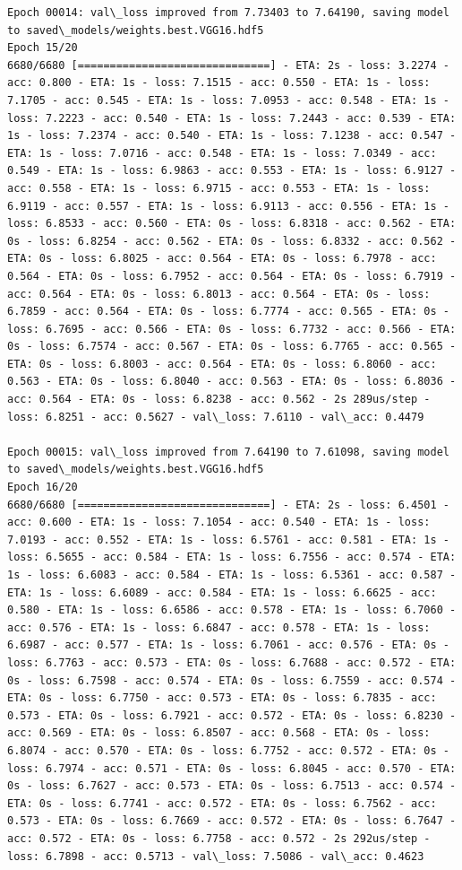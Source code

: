 \documentclass[11pt]{article}
\begin{document}
\begin{Verbatim}[commandchars=\\\{\}]
Epoch 00014: val\_loss improved from 7.73403 to 7.64190, saving model to saved\_models/weights.best.VGG16.hdf5
Epoch 15/20
6680/6680 [==============================] - ETA: 2s - loss: 3.2274 - acc: 0.800 - ETA: 1s - loss: 7.1515 - acc: 0.550 - ETA: 1s - loss: 7.1705 - acc: 0.545 - ETA: 1s - loss: 7.0953 - acc: 0.548 - ETA: 1s - loss: 7.2223 - acc: 0.540 - ETA: 1s - loss: 7.2443 - acc: 0.539 - ETA: 1s - loss: 7.2374 - acc: 0.540 - ETA: 1s - loss: 7.1238 - acc: 0.547 - ETA: 1s - loss: 7.0716 - acc: 0.548 - ETA: 1s - loss: 7.0349 - acc: 0.549 - ETA: 1s - loss: 6.9863 - acc: 0.553 - ETA: 1s - loss: 6.9127 - acc: 0.558 - ETA: 1s - loss: 6.9715 - acc: 0.553 - ETA: 1s - loss: 6.9119 - acc: 0.557 - ETA: 1s - loss: 6.9113 - acc: 0.556 - ETA: 1s - loss: 6.8533 - acc: 0.560 - ETA: 0s - loss: 6.8318 - acc: 0.562 - ETA: 0s - loss: 6.8254 - acc: 0.562 - ETA: 0s - loss: 6.8332 - acc: 0.562 - ETA: 0s - loss: 6.8025 - acc: 0.564 - ETA: 0s - loss: 6.7978 - acc: 0.564 - ETA: 0s - loss: 6.7952 - acc: 0.564 - ETA: 0s - loss: 6.7919 - acc: 0.564 - ETA: 0s - loss: 6.8013 - acc: 0.564 - ETA: 0s - loss: 6.7859 - acc: 0.564 - ETA: 0s - loss: 6.7774 - acc: 0.565 - ETA: 0s - loss: 6.7695 - acc: 0.566 - ETA: 0s - loss: 6.7732 - acc: 0.566 - ETA: 0s - loss: 6.7574 - acc: 0.567 - ETA: 0s - loss: 6.7765 - acc: 0.565 - ETA: 0s - loss: 6.8003 - acc: 0.564 - ETA: 0s - loss: 6.8060 - acc: 0.563 - ETA: 0s - loss: 6.8040 - acc: 0.563 - ETA: 0s - loss: 6.8036 - acc: 0.564 - ETA: 0s - loss: 6.8238 - acc: 0.562 - 2s 289us/step - loss: 6.8251 - acc: 0.5627 - val\_loss: 7.6110 - val\_acc: 0.4479

Epoch 00015: val\_loss improved from 7.64190 to 7.61098, saving model to saved\_models/weights.best.VGG16.hdf5
Epoch 16/20
6680/6680 [==============================] - ETA: 2s - loss: 6.4501 - acc: 0.600 - ETA: 1s - loss: 7.1054 - acc: 0.540 - ETA: 1s - loss: 7.0193 - acc: 0.552 - ETA: 1s - loss: 6.5761 - acc: 0.581 - ETA: 1s - loss: 6.5655 - acc: 0.584 - ETA: 1s - loss: 6.7556 - acc: 0.574 - ETA: 1s - loss: 6.6083 - acc: 0.584 - ETA: 1s - loss: 6.5361 - acc: 0.587 - ETA: 1s - loss: 6.6089 - acc: 0.584 - ETA: 1s - loss: 6.6625 - acc: 0.580 - ETA: 1s - loss: 6.6586 - acc: 0.578 - ETA: 1s - loss: 6.7060 - acc: 0.576 - ETA: 1s - loss: 6.6847 - acc: 0.578 - ETA: 1s - loss: 6.6987 - acc: 0.577 - ETA: 1s - loss: 6.7061 - acc: 0.576 - ETA: 0s - loss: 6.7763 - acc: 0.573 - ETA: 0s - loss: 6.7688 - acc: 0.572 - ETA: 0s - loss: 6.7598 - acc: 0.574 - ETA: 0s - loss: 6.7559 - acc: 0.574 - ETA: 0s - loss: 6.7750 - acc: 0.573 - ETA: 0s - loss: 6.7835 - acc: 0.573 - ETA: 0s - loss: 6.7921 - acc: 0.572 - ETA: 0s - loss: 6.8230 - acc: 0.569 - ETA: 0s - loss: 6.8507 - acc: 0.568 - ETA: 0s - loss: 6.8074 - acc: 0.570 - ETA: 0s - loss: 6.7752 - acc: 0.572 - ETA: 0s - loss: 6.7974 - acc: 0.571 - ETA: 0s - loss: 6.8045 - acc: 0.570 - ETA: 0s - loss: 6.7627 - acc: 0.573 - ETA: 0s - loss: 6.7513 - acc: 0.574 - ETA: 0s - loss: 6.7741 - acc: 0.572 - ETA: 0s - loss: 6.7562 - acc: 0.573 - ETA: 0s - loss: 6.7669 - acc: 0.572 - ETA: 0s - loss: 6.7647 - acc: 0.572 - ETA: 0s - loss: 6.7758 - acc: 0.572 - 2s 292us/step - loss: 6.7898 - acc: 0.5713 - val\_loss: 7.5086 - val\_acc: 0.4623


\end{Verbatim}
\end{document}
